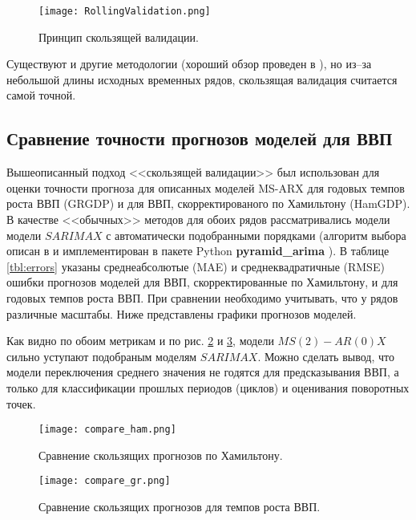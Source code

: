 \documentclass[a4paper,14pt]{extreport}
\begin{document}
	\begin{figure}
		\texttt{[image: RollingValidation.png]}
		\caption{Принцип скользящей валидации.}
		\label{fig:rolling_validation}
	\end{figure}
	
	Существуют и другие методологии (хороший обзор проведен в \cite{hyndCV}), но из--за небольшой длины исходных временных рядов, скользящая валидация считается самой точной.
	
	
	\subsection{Сравнение точности прогнозов моделей для ВВП}
	
	Вышеописанный подход <<скользящей валидации>> был использован для оценки точности прогноза для описанных моделей MS-ARX для годовых темпов роста ВВП (GRGDP) и для ВВП, скорректированого по Хамильтону (HamGDP). В качестве <<обычных>> методов для обоих рядов рассматривались модели модели $SARIMAX$ с автоматически подобранными порядками (алгоритм выбора описан в \cite{hynd_autoarima} и имплементирован в пакете Python \textbf{pyramid\_arima} \cite{pyramid_arima}). В таблице \ref{tbl:errors} указаны среднеабсолютые (MAE) и среднеквадратичные (RMSE) ошибки прогнозов моделей для ВВП, скорректированные по Хамильтону, и для годовых темпов роста ВВП. При сравнении необходимо учитывать, что у рядов различные масштабы. Ниже представлены графики прогнозов моделей.
	
	Как видно по обоим метрикам и по рис. \ref{fig:rollcompare-ham} и \ref{fig:rollcompare-tr}, модели $MS(2)-AR(0)X$ сильно уступают подобраным моделям $SARIMAX$. Можно сделать вывод, что модели переключения среднего значения не годятся для предсказывания ВВП, а только для классификации прошлых периодов (циклов) и оценивания поворотных точек.
	
	\begin{figure}
		\texttt{[image: compare\_ham.png]}
		\caption{Сравнение скользящих прогнозов по Хамильтону.}
		\label{fig:rollcompare-ham}
	\end{figure}
	
	\begin{figure}
		\texttt{[image: compare\_gr.png]}
		\caption{Сравнение скользящих прогнозов для темпов роста ВВП.}
		\label{fig:rollcompare-tr}
	\end{figure}
	
\end{document}
